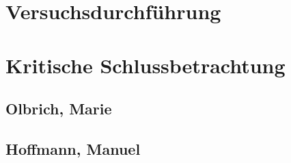 \documentclass[a4paper, 11pt, fleqn, DIV=10, twoside, BCOR=10mm]{scrreprt}
\begin{document}
\chapter{Versuchsdurchführung}
\chapter{Kritische Schlussbetrachtung}
\section{Olbrich, Marie}
 
\section{Hoffmann, Manuel}

\end{document}
